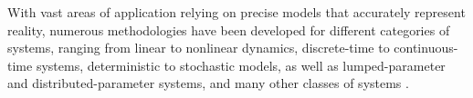 With vast areas of application relying on precise models that accurately represent reality, numerous methodologies have been developed for different categories of systems, ranging from linear to nonlinear dynamics, discrete-time to continuous-time systems, deterministic to stochastic models, as well as lumped-parameter and distributed-parameter systems, and many other classes of systems \cite{schoukens2019nonlinear,sattar2022non,khosravi2021Koopman,umenberger2018maximum,khansari2017learning,liu2024learning,khosravi2021SSG}.
%

